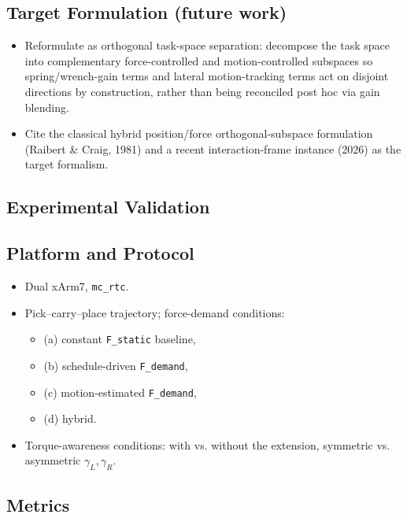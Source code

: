 \documentclass[conference]{IEEEtran}
\begin{document}
\subsection{Target Formulation (future work)}
\begin{itemize}
    \item Reformulate as orthogonal task-space separation: decompose the task space into complementary force-controlled and motion-controlled subspaces so spring/wrench-gain terms and lateral motion-tracking terms act on disjoint directions by construction, rather than being reconciled post hoc via gain blending.

    \item Cite the classical hybrid position/force orthogonal-subspace formulation (Raibert \& Craig, 1981) and a recent interaction-frame instance (2026) as the target formalism.
\end{itemize}


\subsection{Experimental Validation}



\subsection{Platform and Protocol}

\begin{itemize}
    \item Dual xArm7, \texttt{mc\_rtc}.

    \item Pick--carry--place trajectory; force-demand conditions:
    \begin{itemize}
        \item (a) constant \texttt{F\_static} baseline,
        \item (b) schedule-driven \texttt{F\_demand},
        \item (c) motion-estimated \texttt{F\_demand},
        \item (d) hybrid.
    \end{itemize}

    \item Torque-awareness conditions: with vs. without the extension, symmetric vs. asymmetric \(\gamma_L,\gamma_R\).

\end{itemize}

\subsection{Metrics}
\end{document}
